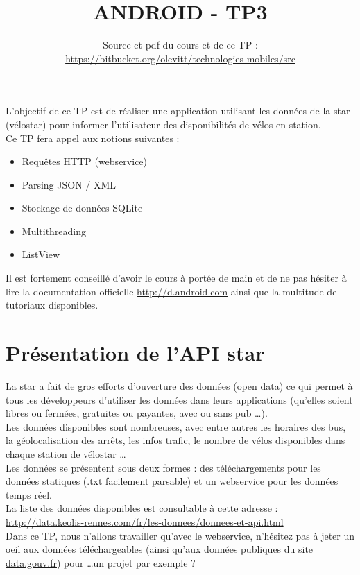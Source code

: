 \documentclass{article}
\title{ANDROID - TP3}
\date{Source et pdf du cours et de ce TP
:\\ \href{https://bitbucket.org/olevitt/technologies-mobiles}{https://bitbucket.org/olevitt/technologies-mobiles/src}}
\begin{document}
\maketitle
L'objectif de ce TP est de réaliser une application utilisant les données de la star (vélostar) pour informer l'utilisateur des disponibilités de vélos en station.\\
Ce TP fera appel aux notions suivantes :
\begin{itemize}
  \item Requêtes HTTP (webservice)
  \item Parsing JSON / XML
  \item Stockage de données SQLite
  \item Multithreading
  \item ListView
\end{itemize}
Il est fortement conseillé d'avoir le cours à portée de main et de ne pas hésiter à lire la documentation officielle 
\href{http://d.android.com}{http://d.android.com} ainsi que la multitude de tutoriaux disponibles.\\
\section{Présentation de l'API star}
La star a fait de gros efforts d'ouverture des données (open data) ce qui permet à tous les développeurs d'utiliser les données dans leurs applications (qu'elles soient libres ou fermées, gratuites ou payantes, avec ou sans pub \ldots).\\
Les données disponibles sont nombreuses, avec entre autres les horaires des bus, la géolocalisation des arrêts, les infos trafic, le nombre de vélos disponibles dans chaque station de vélostar \ldots\\
Les données se présentent sous deux formes : des téléchargements pour les données statiques (.txt facilement parsable) et un webservice pour les données temps réel.\\
La liste des données disponibles est consultable à cette adresse : \href{http://data.keolis-rennes.com/fr/les-donnees/donnees-et-api.html}{http://data.keolis-rennes.com/fr/les-donnees/donnees-et-api.html}\\
Dans ce TP, nous n'allons travailler qu'avec le webservice, n'hésitez pas à jeter un oeil aux données téléchargeables (ainsi qu'aux données publiques du site \href{http://www.data.gouv.fr/}{data.gouv.fr}) pour \ldots un projet par exemple ?
\end{document}
